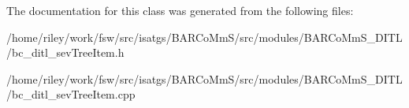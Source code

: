 The documentation for this class was generated from the following files\+:\begin{DoxyCompactItemize}
\item 
/home/riley/work/fsw/src/isatgs/\+B\+A\+R\+Co\+Mm\+S/src/modules/\+B\+A\+R\+Co\+Mm\+S\+\_\+\+D\+I\+T\+L/bc\+\_\+ditl\+\_\+sev\+Tree\+Item.\+h\item 
/home/riley/work/fsw/src/isatgs/\+B\+A\+R\+Co\+Mm\+S/src/modules/\+B\+A\+R\+Co\+Mm\+S\+\_\+\+D\+I\+T\+L/bc\+\_\+ditl\+\_\+sev\+Tree\+Item.\+cpp\end{DoxyCompactItemize}
